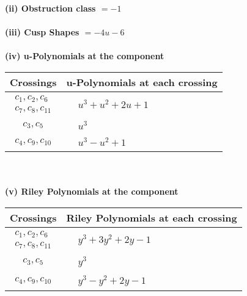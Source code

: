 \documentclass[1p]{elsarticle_modified}
\theoremstyle{definition}
\begin{document}
\flushleft \textbf{(ii) Obstruction class $= -1$}\\~\\
\flushleft \textbf{(iii) Cusp Shapes $= -4 u-6$}\\~\\
\newpage\renewcommand{\arraystretch}{1}
\flushleft \textbf{(iv) u-Polynomials at the component}\newline \\
\begin{tabular}{m{50pt}|m{274pt}}
Crossings & \hspace{64pt}u-Polynomials at each crossing \\
\hline $$\begin{aligned}c_{1},c_{2},c_{6}\\c_{7},c_{8},c_{11}\end{aligned}$$&$\begin{aligned}
&u^3+u^2+2 u+1
\end{aligned}$\\
\hline $$\begin{aligned}c_{3},c_{5}\end{aligned}$$&$\begin{aligned}
&u^3
\end{aligned}$\\
\hline $$\begin{aligned}c_{4},c_{9},c_{10}\end{aligned}$$&$\begin{aligned}
&u^3- u^2+1
\end{aligned}$\\
\hline
\end{tabular}\\~\\
\newpage\renewcommand{\arraystretch}{1}
\flushleft \textbf{(v) Riley Polynomials at the component}\newline \\
\begin{tabular}{m{50pt}|m{274pt}}
Crossings & \hspace{64pt}Riley Polynomials at each crossing \\
\hline $$\begin{aligned}c_{1},c_{2},c_{6}\\c_{7},c_{8},c_{11}\end{aligned}$$&$\begin{aligned}
&y^3+3 y^2+2 y-1
\end{aligned}$\\
\hline $$\begin{aligned}c_{3},c_{5}\end{aligned}$$&$\begin{aligned}
&y^3
\end{aligned}$\\
\hline $$\begin{aligned}c_{4},c_{9},c_{10}\end{aligned}$$&$\begin{aligned}
&y^3- y^2+2 y-1
\end{aligned}$\\
\hline
\end{tabular}\\~\\
\end{document}
